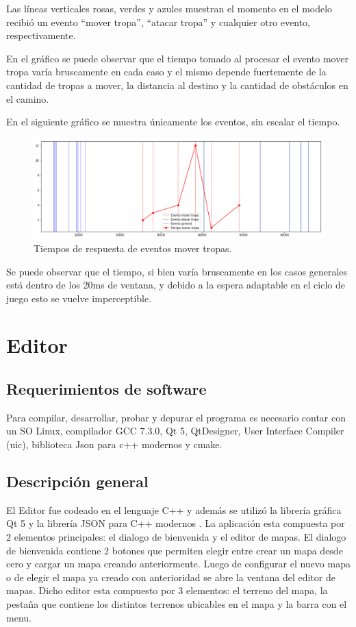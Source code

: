 \documentclass[titlepage,a4paper,12pt]{article}
\begin{document}
Las líneas verticales rosas, verdes y azules muestran el momento en el modelo recibió un evento ``mover tropa'', ``atacar tropa'' y cualquier otro evento, respectivamente.


En el gráfico se puede observar que el tiempo tomado al procesar el evento mover tropa varía bruscamente en cada caso y el mismo depende fuertemente de la cantidad de tropas a mover, la distancia al destino y la cantidad de obstáculos en el camino.

En el siguiente gráfico se muestra únicamente los eventos, sin escalar el tiempo. 

\begin{figure}[H]
	\centering
	\includegraphics[width=16cm]{../imagenes/analisis-tiempos-2.png}
	\caption{\label{fig:tiempos-ciclo-juego-2} Tiempos de respuesta de eventos mover tropas.}
\end{figure}

Se puede observar que el tiempo, si bien varía bruscamente en los casos generales está dentro de los 20ms de ventana, y debido a la espera adaptable en el ciclo de juego esto se vuelve imperceptible.

\newpage
\section{Editor}

\subsection{Requerimientos de software}
Para compilar, desarrollar, probar y depurar el programa es necesario contar con un SO Linux, compilador GCC 7.3.0, Qt 5, QtDesigner, User Interface Compiler (uic), biblioteca Json para c++ modernos y cmake.

\subsection{Descripción general}

El Editor fue codeado en el lenguaje C++ y además se utilizó la librería gráfica Qt 5 y la librería JSON para C++ modernos . La aplicación esta compuesta por 2 elementos principales: el dialogo de bienvenida y el editor de mapas. El dialogo de bienvenida contiene 2 botones que permiten elegir entre crear un mapa desde cero y cargar un mapa creando anteriormente. Luego de configurar el nuevo mapa o de elegir el mapa ya creado con anterioridad se abre la ventana del editor de mapas. Dicho editor esta compuesto por 3 elementos: el terreno del mapa, la pestaña que contiene los distintos terrenos ubicables en el mapa y la barra con el menu.\\
\end{document}
